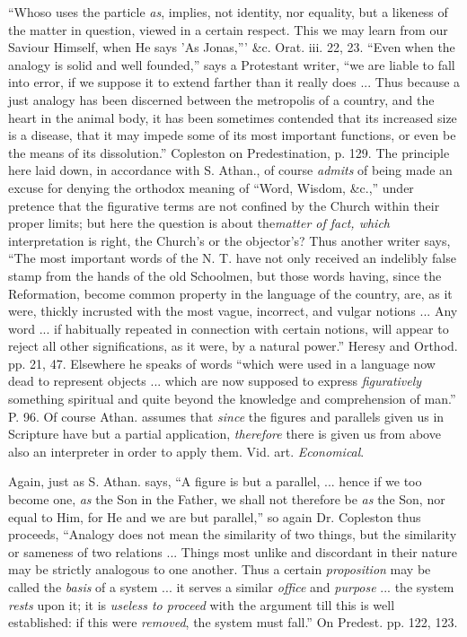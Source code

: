 ``Whoso uses the particle \emph{as}, implies,
not identity, nor equality, but a likeness of the matter in question,
viewed in a certain respect. This we may learn from our Saviour
Himself, when He says 'As Jonas,''' \&c. Orat. iii. 22, 23. ``Even when the analogy is solid and well founded,'' says a
Protestant writer, ``we are liable to fall into error, if we suppose
it to extend farther than it really does ... Thus because a just
analogy has been discerned between the metropolis of a country, and
the heart in the animal body, it has been sometimes contended that its
increased size is a disease, that it may impede some of its most
important functions, or even be the means of its dissolution.''
Copleston on Predestination, p. 129. The principle here laid down, in
accordance with S. Athan., of course \emph{admits} of being made an
excuse for denying the orthodox meaning of ``Word, Wisdom,
\&c.,'' under pretence that the figurative terms are not confined
by the Church within their proper limits; but here the question is
about the\emph{matter of fact, which} interpretation is right, the
Church's or the objector's? Thus another writer says, ``The most
important words of the N. T. have not only received an indelibly false
stamp from the hands of the old Schoolmen, but those words having,
since the Reformation, become common property in the language of the
country, are, as it were, thickly incrusted with the most vague,
incorrect, and vulgar notions ... Any word ... if habitually repeated
in connection with certain notions, will appear to reject all other
significations, as it were, by a natural power.'' Heresy and Orthod.
pp. 21, 47. Elsewhere he speaks of words ``which were used in a
language now dead to represent objects ... which are now supposed to
express \emph{figuratively} something spiritual and quite beyond the
knowledge and comprehension of man.'' P. 96. Of course Athan. assumes
that \emph{since} the figures and parallels given us in Scripture have
but a partial application, \emph{therefore} there is given us from
above also an interpreter in order to apply them. Vid. art. \emph{Economical}.

Again, just as S. Athan. says, ``A figure is but
a parallel, ... hence if we too become one, \emph{as} the Son in the
Father, we shall not therefore be \emph{as} the Son, nor equal to Him,
for He and we are but parallel,'' so again Dr. Copleston thus
proceeds, ``Analogy does not mean the similarity of two things, but
the similarity or sameness of two relations ... Things most
unlike and discordant in their nature may be strictly analogous to one
another. Thus a certain \emph{proposition} may be called the \emph{basis}
of a system ... it serves a similar \emph{office} and \emph{purpose}
... the system \emph{rests} upon it; it is \emph{useless to proceed}
with the argument till this is well established: if this were \emph{removed},
the system must fall.'' On Predest. pp. 122, 123.

